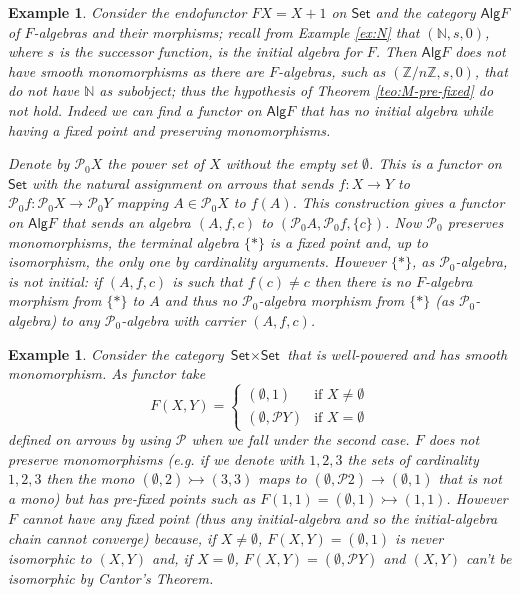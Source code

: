 \documentclass[letterpaper, 11pt, oneside]{memoir}
\theoremstyle{myteo}
\newtheorem{example}[theorem]{Example}
\numberwithin{equation}{section}
\newcommand{\Alg}{\textsf{Alg}}
\newcommand{\Set}{\textsf{Set}}
\newcommand{\N}{\mathbb{N}}
\begin{document}
\begin{example}
  Consider the endofunctor \(FX = X + 1\) on \(\Set\) and the category \(\Alg F\) of \(F\)-algebras and their morphisms; recall from Example \ref{ex:N} that  \((\N, s, 0)\), where \(s\) is the successor function, is the initial algebra for \(F\).
  Then \(\Alg F\) does not have smooth monomorphisms as there are \(F\)-algebras, such as \((\mathbb{Z}/n\mathbb{Z}, s, 0)\), that do not have \(\N\) as subobject; thus the hypothesis of Theorem \ref{teo:M-pre-fixed} do not hold.
  Indeed we can find a functor on \(\Alg F\) that has no initial algebra while having a fixed point and preserving monomorphisms.

  Denote by \(\mathcal{P}_0X\) the power set of \(X\) without the empty set \(\emptyset\).
  This is a functor on \(\Set\) with the natural assignment on arrows that sends \(f : X \to Y\) to \(\mathcal{P}_0f : \mathcal{P}_0X \to \mathcal{P}_0Y\) mapping \(A \in \mathcal{P}_0X\) to \(f(A)\).
  This construction gives a functor on \(\Alg F\) that sends an algebra \((A, f, c)\) to \((\mathcal{P}_0A, \mathcal{P}_0f, \{c\})\).
  Now \(\mathcal{P}_0\) preserves monomorphisms, the terminal algebra \(\{*\}\) is a fixed point and, up to isomorphism, the only one by cardinality arguments.
  However \(\{*\}\), as \(\mathcal{P}_0\)-algebra, is not initial: if \((A, f, c)\) is such that \(f(c) \neq c\) then there is no \(F\)-algebra morphism from \(\{*\}\) to \(A\) and thus no \(\mathcal{P}_0\)-algebra morphism from \(\{*\}\) (as \(\mathcal{P}_0\)-algebra) to any \(\mathcal{P}_0\)-algebra with carrier \((A, f, c)\).
\end{example}

\begin{example}
  Consider the category \(\Set \times \Set\) that is well-powered and has smooth monomorphism.
  As functor take
  \begin{equation*}
    F(X, Y) = \begin{cases}
      (\emptyset, 1) & \text{if } X \neq \emptyset \\
      (\emptyset, \mathcal{P}Y) & \text{if } X = \emptyset
    \end{cases}
  \end{equation*}
  defined on arrows by using \(\mathcal{P}\) when we fall under the second case.
  \(F\) does not preserve monomorphisms (e.g. if we denote with \(1, 2, 3\) the sets of cardinality \(1, 2, 3\) then the mono \((\emptyset, 2) \rightarrowtail (3, 3)\) maps to \((\emptyset, \mathcal{P}2) \to (\emptyset, 1)\) that is not a mono) but has pre-fixed points such as \(F(1, 1) = (\emptyset, 1) \rightarrowtail (1, 1)\).
  However \(F\) cannot have any fixed point (thus any initial-algebra and so the initial-algebra chain cannot converge) because, if \(X \neq \emptyset\), \(F(X, Y) = (\emptyset, 1)\) is never isomorphic to \((X, Y)\) and, if \(X = \emptyset\), \(F(X, Y) = (\emptyset, \mathcal{P}Y)\) and \((X, Y)\) can't be isomorphic by Cantor's Theorem. 
\end{example}
\end{document}
